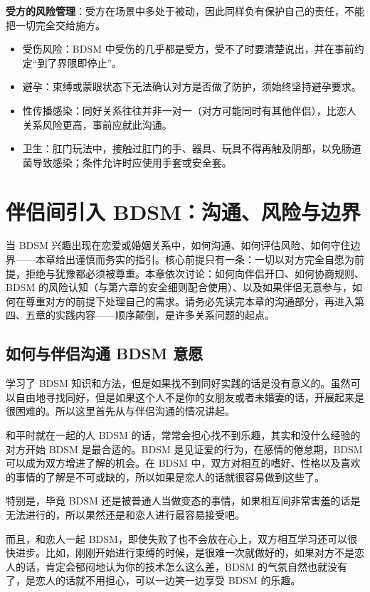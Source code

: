 \documentclass[12pt,UTF8]{ctexbook}
\begin{document}
\noindent\textbf{受方的风险管理}：受方在场景中多处于被动，因此同样负有保护自己的责任，不能把一切完全交给施方。

\begin{itemize}
\item 受伤风险：BDSM 中受伤的几乎都是受方，受不了时要清楚说出，并在事前约定“到了界限即停止”。
\item 避孕：束缚或蒙眼状态下无法确认对方是否做了防护，须始终坚持避孕要求。
\item 性传播感染：同好关系往往并非一对一（对方可能同时有其他伴侣），比恋人关系风险更高，事前应就此沟通。
\item 卫生：肛门玩法中，接触过肛门的手、器具、玩具不得再触及阴部，以免肠道菌导致感染；条件允许时应使用手套或安全套。
\end{itemize}


\chapter{伴侣间引入 BDSM：沟通、风险与边界}

当 BDSM 兴趣出现在恋爱或婚姻关系中，如何沟通、如何评估风险、如何守住边界——本章给出谨慎而务实的指引。核心前提只有一条：一切以对方完全自愿为前提，拒绝与犹豫都必须被尊重。本章依次讨论：如何向伴侣开口、如何协商规则、BDSM 的风险认知（与第六章的安全细则配合使用）、以及如果伴侣无意参与，如何在尊重对方的前提下处理自己的需求。请务必先读完本章的沟通部分，再进入第四、五章的实践内容——顺序颠倒，是许多关系问题的起点。

\section{如何与伴侣沟通 BDSM 意愿}

学习了 BDSM 知识和方法，但是如果找不到同好实践的话是没有意义的。虽然可以自由地寻找同好，但是如果这个人不是你的女朋友或者未婚妻的话，开展起来是很困难的。所以这里首先从与伴侣沟通的情况讲起。

和平时就在一起的人 BDSM 的话，常常会担心找不到乐趣，其实和没什么经验的对方开始 BDSM 是最合适的。BDSM 是见证爱的行为，在感情的倦怠期，BDSM 可以成为双方增进了解的机会。在 BDSM 中，双方对相互的嗜好、性格以及喜欢的事情的了解是不可或缺的，所以如果是恋人的话就很容易做到这些了。

特别是，毕竟 BDSM 还是被普通人当做变态的事情，如果相互间非常害羞的话是无法进行的，所以果然还是和恋人进行最容易接受吧。

而且，和恋人一起 BDSM，即使失败了也不会放在心上，双方相互学习还可以很快进步。比如，刚刚开始进行束缚的时候，是很难一次就做好的，如果对方不是恋人的话，肯定会郁闷地认为你的技术怎么这么差，BDSM 的气氛自然也就没有了，是恋人的话就不用担心，可以一边笑一边享受 BDSM 的乐趣。
\end{document}
